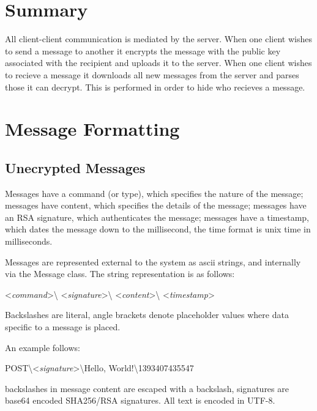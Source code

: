 \section{Summary}
All client-client communication is mediated by the server. When one client
wishes to send a message to another it encrypts the message with the public key
associated with the recipient and uploads it to the server. When one client
wishes to recieve a message it downloads all new messages from the server and
parses those it can decrypt. This is performed in order to hide who recieves a
message.

\section{Message Formatting}
\subsection{Unecrypted Messages}
Messages have a command (or type), which specifies the nature of the message;
messages have content, which specifies the details of the message;
messages have an RSA signature, which authenticates the message;
messages have a timestamp, which dates the message down to the millisecond, the
time format is unix time in milliseconds.

Messages are represented external to the system as ascii strings, and internally
via the Message class. The string representation is as follows:\\

\begin{center}
\textless \textit{command}\textgreater\textbackslash
\textless \textit{signature}\textgreater\textbackslash
\textless \textit{content}\textgreater\textbackslash
\textless \textit{timestamp}\textgreater
\end{center}

Backslashes are literal, angle brackets denote placeholder values where data
specific to a message is placed.

An example follows:
\begin{center}
POST\textbackslash\textless\textit{signature}\textgreater\textbackslash Hello, World!\textbackslash 1393407435547
\end{center}

backslashes in message content are escaped with a backslash, signatures are
base64 encoded SHA256/RSA signatures. All text is encoded in UTF-8.

